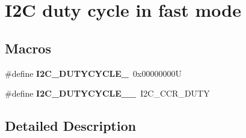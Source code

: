 \hypertarget{group___i2_c__duty__cycle__in__fast__mode}{}\section{I2C duty cycle in fast mode}
\label{group___i2_c__duty__cycle__in__fast__mode}
\subsection*{Macros}
\begin{DoxyCompactItemize}
\item 
\mbox{\label{group___i2_c__duty__cycle__in__fast__mode_ga414df076d339793a7c761033346fd4ca}} 
\#define {\bfseries I2\+C\+\_\+\+D\+U\+T\+Y\+C\+Y\+C\+L\+E\+\_}~0x00000000U
\item 
\mbox{\label{group___i2_c__duty__cycle__in__fast__mode_gae9d1f8a140f052c1fcbcd87b4181f78d}} 
\#define {\bfseries I2\+C\+\_\+\+D\+U\+T\+Y\+C\+Y\+C\+L\+E\+\_\+\_}~I2\+C\+\_\+\+C\+C\+R\+\_\+\+D\+U\+TY
\end{DoxyCompactItemize}


\subsection{Detailed Description}
